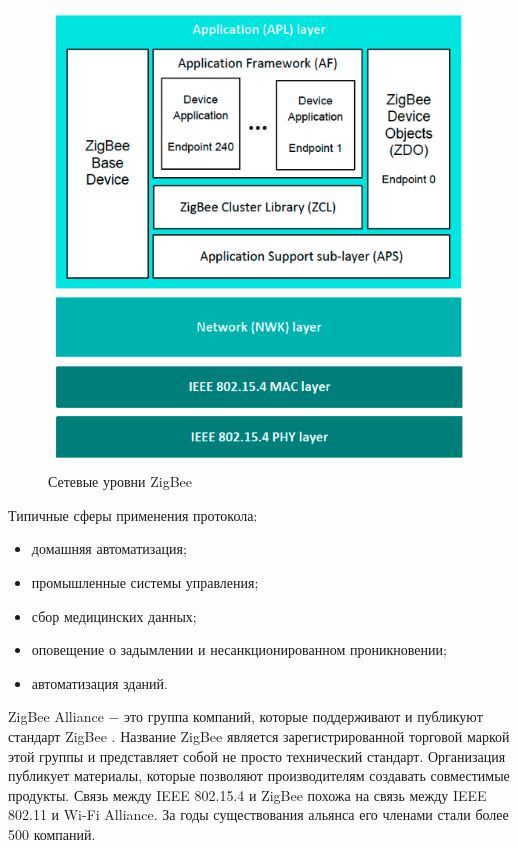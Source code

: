 	\begin{figure}[h]
		\centering
		\includegraphics[scale=0.6]{resources/ZigBee-network-layers}
		\caption{Сетевые уровни ZigBee}
		\label{fig1.2}
	\end{figure}
	
   Типичные сферы применения протокола:
	\begin{itemize}
		\item домашняя автоматизация;
		\item промышленные системы управления;
		\item сбор медицинских данных;
		\item оповещение о задымлении и несанкционированном проникновении;
		\item автоматизация зданий.
	\end{itemize}

	ZigBee Alliance $-$ это группа компаний, которые поддерживают и публикуют стандарт ZigBee
	 \cite{zigbee-alliance}. Название 
	ZigBee является зарегистрированной торговой маркой этой группы и представляет собой не просто 
	технический стандарт. Организация публикует материалы, которые позволяют производителям 
	создавать совместимые продукты. Связь между IEEE 802.15.4 и ZigBee похожа на связь между 
	IEEE 802.11 и Wi-Fi Alliance. За годы существования альянса его членами стали более 500 компаний.
	
